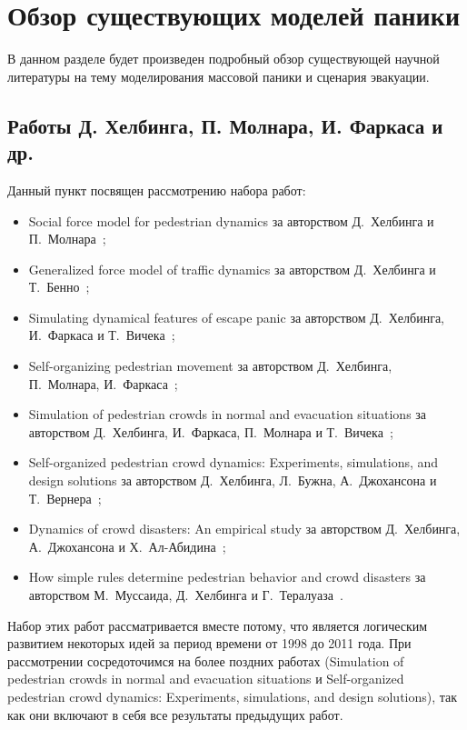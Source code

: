 \section{Обзор существующих моделей паники}
\label{sec:overview}

В данном разделе будет произведен подробный обзор существующей научной литературы на тему моделирования массовой паники и сценария эвакуации.

\subsection{Работы Д. Хелбинга, П. Молнара, И. Фаркаса и др.}
\label{sub:overview:helbing}

Данный пункт посвящен рассмотрению набора работ:

\begin{itemize}
  \item Social force model for pedestrian dynamics за авторством Д.~Хелбинга и П.~Молнара~\cite{helbing_social_force};
  \item Generalized force model of traffic dynamics за авторством Д.~Хелбинга и Т.~Бенно~\cite{helbing1998generalized};
  \item Simulating dynamical features of escape panic за авторством Д.~Хелбинга, И.~Фаркаса и Т.~Вичека~\cite{helbing_escape_panic};
  \item Self-organizing pedestrian movement за авторством Д.~Хелбинга, П.~Молнара, И.~Фаркаса~\cite{helbing2001self};
  \item Simulation of pedestrian crowds in normal and evacuation situations за авторством Д.~Хелбинга, И.~Фаркаса, П.~Молнара и Т.~Вичека~\cite{helbing_evacuation};
  \item Self-organized pedestrian crowd dynamics: Experiments, simulations, and design solutions за авторством Д.~Хелбинга, Л.~Бужна, А.~Джохансона и Т.~Вернера~\cite{helbing2005self};
  \item Dynamics of crowd disasters: An empirical study за авторством Д.~Хелбинга, А.~Джохансона и Х.~Ал-Абидина~\cite{helbing2007dynamics};
  \item How simple rules determine pedestrian behavior and crowd disasters за авторством М.~Муссаида, Д.~Хелбинга и Г.~Тералуаза~\cite{moussaid2011simple}.
\end{itemize}

Набор этих работ рассматривается вместе потому, что является логическим развитием некоторых идей за период времени от 1998 до 2011 года.
При рассмотрении сосредоточимся на более поздних работах (Simulation of pedestrian crowds in normal and evacuation situations и Self-organized pedestrian crowd dynamics: Experiments, simulations, and design solutions), так как они включают в себя все результаты предыдущих работ.


